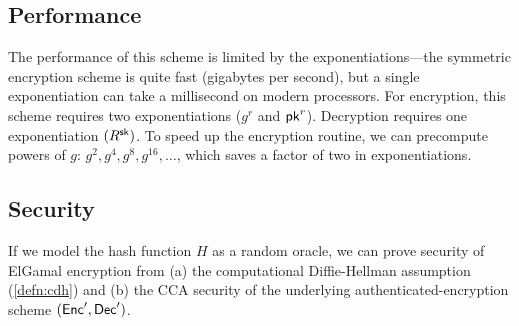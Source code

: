 \subsection{Performance}
The performance of this scheme is limited by the exponentiations---the symmetric encryption scheme is quite fast (gigabytes per second), but a single exponentiation can take a millisecond on modern processors. For encryption, this scheme requires two exponentiations ($g^r$ and $\mathsf{pk}^r$). Decryption requires one exponentiation $(R^{\mathsf{sk}})$.
To speed up the encryption routine, we can precompute powers of $g$: $g^2, g^4, g^8, g^{16}, \dots$, which saves a factor of two in exponentiations.

\subsection{Security}
If we model the hash function $H$ as a random oracle, 
we can prove security of ElGamal encryption from 
(a) the computational Diffie-Hellman assumption (\cref{defn:cdh}) and
(b) the CCA security of the underlying authenticated-encryption
scheme $(\mathsf{Enc}', \mathsf{Dec}')$.

